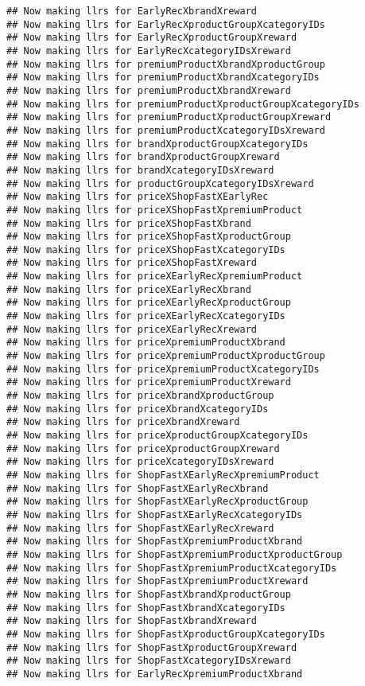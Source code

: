 \documentclass[10pt]{report}
\begin{document}
\begin{verbatim}
## Now making llrs for EarlyRecXbrandXreward
## Now making llrs for EarlyRecXproductGroupXcategoryIDs
## Now making llrs for EarlyRecXproductGroupXreward
## Now making llrs for EarlyRecXcategoryIDsXreward
## Now making llrs for premiumProductXbrandXproductGroup
## Now making llrs for premiumProductXbrandXcategoryIDs
## Now making llrs for premiumProductXbrandXreward
## Now making llrs for premiumProductXproductGroupXcategoryIDs
## Now making llrs for premiumProductXproductGroupXreward
## Now making llrs for premiumProductXcategoryIDsXreward
## Now making llrs for brandXproductGroupXcategoryIDs
## Now making llrs for brandXproductGroupXreward
## Now making llrs for brandXcategoryIDsXreward
## Now making llrs for productGroupXcategoryIDsXreward
## Now making llrs for priceXShopFastXEarlyRec
## Now making llrs for priceXShopFastXpremiumProduct
## Now making llrs for priceXShopFastXbrand
## Now making llrs for priceXShopFastXproductGroup
## Now making llrs for priceXShopFastXcategoryIDs
## Now making llrs for priceXShopFastXreward
## Now making llrs for priceXEarlyRecXpremiumProduct
## Now making llrs for priceXEarlyRecXbrand
## Now making llrs for priceXEarlyRecXproductGroup
## Now making llrs for priceXEarlyRecXcategoryIDs
## Now making llrs for priceXEarlyRecXreward
## Now making llrs for priceXpremiumProductXbrand
## Now making llrs for priceXpremiumProductXproductGroup
## Now making llrs for priceXpremiumProductXcategoryIDs
## Now making llrs for priceXpremiumProductXreward
## Now making llrs for priceXbrandXproductGroup
## Now making llrs for priceXbrandXcategoryIDs
## Now making llrs for priceXbrandXreward
## Now making llrs for priceXproductGroupXcategoryIDs
## Now making llrs for priceXproductGroupXreward
## Now making llrs for priceXcategoryIDsXreward
## Now making llrs for ShopFastXEarlyRecXpremiumProduct
## Now making llrs for ShopFastXEarlyRecXbrand
## Now making llrs for ShopFastXEarlyRecXproductGroup
## Now making llrs for ShopFastXEarlyRecXcategoryIDs
## Now making llrs for ShopFastXEarlyRecXreward
## Now making llrs for ShopFastXpremiumProductXbrand
## Now making llrs for ShopFastXpremiumProductXproductGroup
## Now making llrs for ShopFastXpremiumProductXcategoryIDs
## Now making llrs for ShopFastXpremiumProductXreward
## Now making llrs for ShopFastXbrandXproductGroup
## Now making llrs for ShopFastXbrandXcategoryIDs
## Now making llrs for ShopFastXbrandXreward
## Now making llrs for ShopFastXproductGroupXcategoryIDs
## Now making llrs for ShopFastXproductGroupXreward
## Now making llrs for ShopFastXcategoryIDsXreward
## Now making llrs for EarlyRecXpremiumProductXbrand

\end{verbatim}
\end{document}

